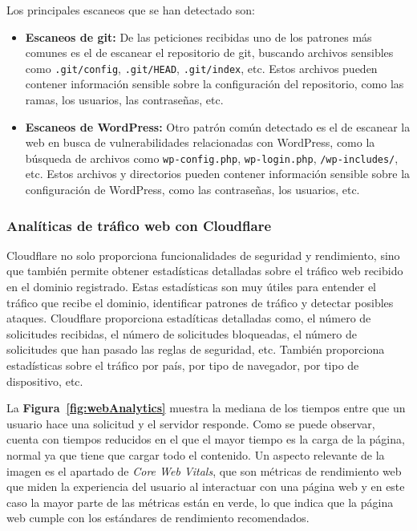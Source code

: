 Los principales escaneos que se han detectado son:
\begin{itemize}
    \item \textbf{Escaneos de git:} De las peticiones recibidas uno de los patrones más comunes es el de escanear el repositorio de git, buscando archivos sensibles como \texttt{.git/config}, \texttt{.git/HEAD}, \texttt{.git/index}, etc. Estos archivos pueden contener información sensible sobre la configuración del repositorio, como las ramas, los usuarios, las contraseñas, etc.
    \item \textbf{Escaneos de WordPress:} Otro patrón común detectado es el de escanear la web en busca de vulnerabilidades relacionadas con WordPress, como la búsqueda de archivos como \texttt{wp-config.php}, \texttt{wp-login.php}, \texttt{/wp-includes/}, etc. Estos archivos y directorios pueden contener información sensible sobre la configuración de WordPress, como las contraseñas, los usuarios, etc.
\end{itemize}

\subsubsection{Analíticas de tráfico web con Cloudflare}

Cloudflare no solo proporciona funcionalidades de seguridad y rendimiento, sino que también permite obtener estadísticas detalladas sobre el tráfico web recibido en el dominio registrado. Estas estadísticas son muy útiles para entender el tráfico que recibe el dominio, identificar patrones de tráfico y detectar posibles ataques.
Cloudflare proporciona estadíticas detalladas como, el número de solicitudes recibidas, el número de solicitudes bloqueadas, el número de solicitudes que han pasado las reglas de seguridad, etc. También proporciona estadísticas sobre el tráfico por país, por tipo de navegador, por tipo de dispositivo, etc.



La \textbf{Figura~\ref{fig:webAnalytics}} muestra la mediana de los tiempos entre que un usuario hace una solicitud y el servidor responde.
Como se puede observar, cuenta con tiempos reducidos en el que el mayor tiempo es la carga de la página, normal ya que tiene que cargar todo el contenido. Un aspecto relevante de la imagen es el apartado de \textit{Core Web Vitals}, que son métricas de rendimiento web que miden la experiencia del usuario al interactuar con una página web y en este caso la mayor parte de las métricas están en verde, lo que indica que la página web cumple con los estándares de rendimiento recomendados.

